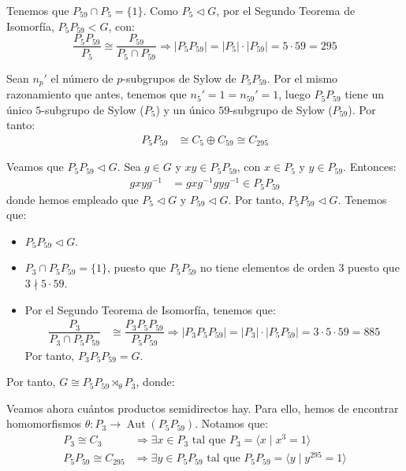 \documentclass[12pt]{article}
\DeclareMathOperator{\Aut}{Aut}
\begin{document}
\begin{ejercicio}
\begin{enumerate}
            Tenemos que $P_{59}\cap P_5=\{1\}$. Como $P_{5}\lhd G$, por el Segundo Teorema de Isomorfía, $P_5P_{59}< G$, con:
            \begin{equation*}
                \dfrac{P_5P_{59}}{P_{5}} \cong \dfrac{P_{59}}{P_{5}\cap P_{59}}
                \Longrightarrow |P_5P_{59}| = |P_5|\cdot |P_{59}| = 5\cdot 59 = 295
            \end{equation*}

            Sean $n_p'$ el número de $p$-subgrupos de Sylow de $P_5P_{59}$. Por el mismo razonamiento que antes, tenemos que $n_5'=1=n_{59}'=1$, luego $P_5P_{59}$ tiene un único $5$-subgrupo de Sylow ($P_5$) y un único $59$-subgrupo de Sylow ($P_{59}$). Por tanto:
            \begin{align*}
                P_5P_{59} & \cong C_5 \oplus C_{59}\cong C_{295}
            \end{align*}

            Veamos que $P_5P_{59}\lhd G$. Sea $g\in G$ y $xy\in P_5P_{59}$, con $x\in P_5$ y $y\in P_{59}$. Entonces:
            \begin{align*}
                gxyg^{-1} & = gxg^{-1}gyg^{-1}\in P_5P_{59}
            \end{align*}
            donde hemos empleado que $P_5\lhd G$ y $P_{59}\lhd G$. Por tanto, $P_5P_{59}\lhd G$. Tenemos que:
            \begin{itemize}
                \item $P_5P_{59}\lhd G$.
                \item $P_3\cap P_5P_{59}=\{1\}$, puesto que $P_5P_{59}$ no tiene elementos de orden $3$ puesto que $3\nmid 5\cdot 59$.
                \item Por el Segundo Teorema de Isomorfía, tenemos que:
                \begin{align*}
                    \dfrac{P_3}{P_3\cap P_5P_{59}} & \cong \dfrac{P_3P_5P_{59}}{P_5P_{59}}\Longrightarrow |P_3P_5P_{59}| = |P_3|\cdot |P_5P_{59}| = 3\cdot 5\cdot 59 = 885
                \end{align*}
                Por tanto, $P_3P_5P_{59}=G$.
            \end{itemize}

            Por tanto, $G\cong P_5P_{59}\rtimes_{\theta}P_3$, donde:
            \Func{\theta}{P_3}{\Aut(P_5P_{59})}{x}{\theta(x)}

            Veamos ahora cuántos productos semidirectos hay. Para ello, hemos de encontrar homomorfismos $\theta:P_3\to \Aut(P_5P_{59})$. Notamos que:
            \begin{align*}
                P_3\cong C_3 &\Longrightarrow \exists x\in P_3 \text{ tal que } P_3=\langle x\mid x^3=1\rangle\\
                P_5P_{59}\cong C_{295} &\Longrightarrow \exists y\in P_5P_{59} \text{ tal que } P_5P_{59}=\langle y\mid y^{295}=1\rangle
            \end{align*}


\end{enumerate}
\end{ejercicio}
\end{document}
